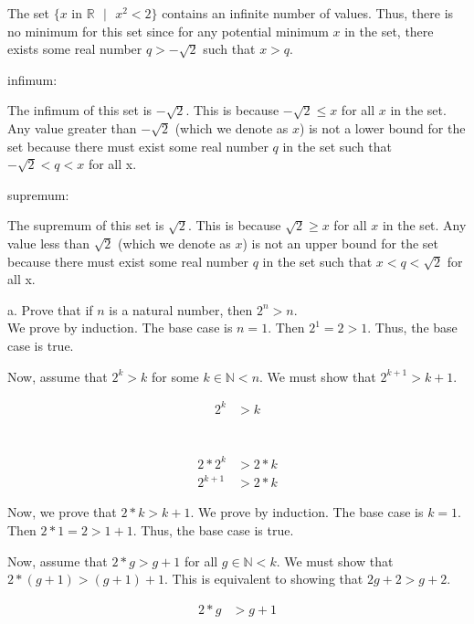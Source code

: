 \documentclass[addpoints]{exam}
\begin{document}
\begin{questions}
The set $\{ x \text{ in } \mathbb{R} \text{ } | \text{ } x^2 < 2 \}$ contains
an infinite number of values. Thus, there is no minimum for this set since for any
potential minimum $x$ in the set, there exists some real number $q > -\sqrt{2}$ such that
$x > q$.

infimum:

The infimum of this set is $-\sqrt{2}$. This is because $-\sqrt{2} \leq x$ for
all $x$ in the set. Any value greater than $-\sqrt{2}$ (which we denote as $x$)
is not a lower bound for the set because there must exist some real number $q$ 
in the set such that $-\sqrt{2} < q < x$ for all x. 

supremum:

The supremum of this set is $\sqrt{2}$. This is because $\sqrt{2} \geq x$ for all
$x$ in the set. Any value less than $\sqrt{2}$ (which we denote as $x$) is 
not an upper bound for the set because there must exist some real number $q$ 
in the set such that $x < q < \sqrt{2}$ for all x. 

\question 

a. Prove that if $n$ is a natural number, then $2^n >n$. \\

We prove by induction. The base case is $n = 1$. Then $2^1 = 2 > 1$. Thus, the base case is true.

Now, assume that $2^k > k$ for some $k \in \mathbb{N} < n$. We must show that $2^{k+1} > k+1$.

\begin{align*}
2^{k} &> k \\
\end{align*}

 \\

\begin{align*}
    2 * 2^{k} &>  2* k \\
    2^{k+1} &> 2 * k
\end{align*}

Now, we prove that $2 * k > k + 1$. We prove by induction. The base case is $k = 1$. Then $2 * 1 = 2 > 1 + 1$. Thus, the base case is true.

Now, assume that $2 * g > g + 1$ for all $g \in \mathbb{N} < k$. We must show that 
$2 * (g+1) > (g+1) + 1$. This is equivalent to showing that $2g + 2 > g + 2$.

\begin{align*}
2 * g &> g + 1 \\
\end{align*}


\end{questions}
\end{document}

